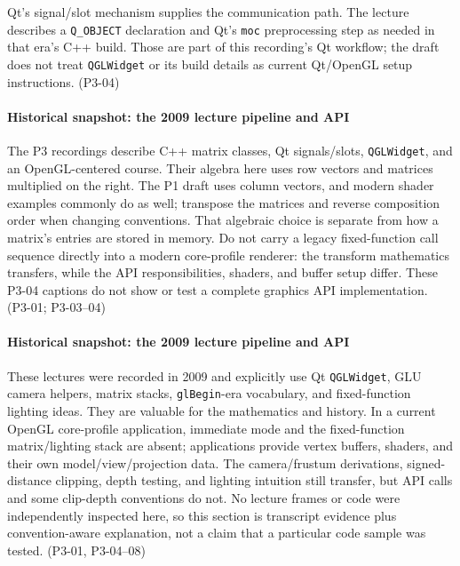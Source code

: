 Qt's signal/slot mechanism supplies the communication path. The lecture describes a \texttt{Q\_OBJECT} declaration and Qt's \texttt{moc} preprocessing step as needed in that era's C++ build. Those are part of this recording's Qt workflow; the draft does not treat \texttt{QGLWidget} or its build details as current Qt/OpenGL setup instructions. (P3-04)

\paragraph{Historical snapshot: the 2009 lecture pipeline and API}\label{historical-snapshot-the-2009-lecture-pipeline-and-api}

The P3 recordings describe C++ matrix classes, Qt signals/slots, \texttt{QGLWidget}, and an OpenGL-centered course. Their algebra here uses row vectors and matrices multiplied on the right. The P1 draft uses column vectors, and modern shader examples commonly do as well; transpose the matrices and reverse composition order when changing conventions. That algebraic choice is separate from how a matrix's entries are stored in memory. Do not carry a legacy fixed-function call sequence directly into a modern core-profile renderer: the transform mathematics transfers, while the API responsibilities, shaders, and buffer setup differ. These P3-04 captions do not show or test a complete graphics API implementation. (P3-01; P3-03--04)

\paragraph{Historical snapshot: the 2009 lecture pipeline and API}\label{historical-snapshot-the-2009-lecture-pipeline-and-api-1}

These lectures were recorded in 2009 and explicitly use Qt \texttt{QGLWidget}, GLU camera helpers, matrix stacks, \texttt{glBegin}-era vocabulary, and fixed-function lighting ideas. They are valuable for the mathematics and history. In a current OpenGL core-profile application, immediate mode and the fixed-function matrix/lighting stack are absent; applications provide vertex buffers, shaders, and their own model/view/projection data. The camera/frustum derivations, signed-distance clipping, depth testing, and lighting intuition still transfer, but API calls and some clip-depth conventions do not. No lecture frames or code were independently inspected here, so this section is transcript evidence plus convention-aware explanation, not a claim that a particular code sample was tested. (P3-01, P3-04--08)

